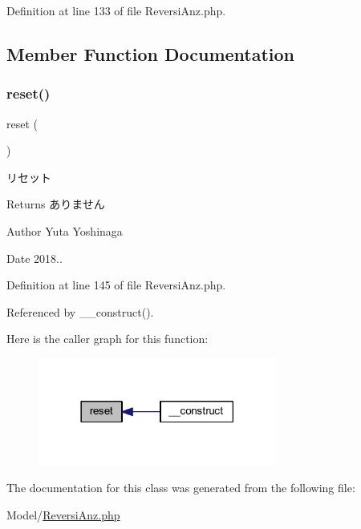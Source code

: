 Definition at line 133 of file Reversi\+Anz.\+php.



\subsection{Member Function Documentation}
\mbox{\label{class_reversi_anz_a4a20559544fdf4dcb457e258dc976cf8}} 
\subsubsection{\texorpdfstring{reset()}{reset()}}
{\footnotesize\ttfamily reset (\begin{DoxyParamCaption}{ }\end{DoxyParamCaption})}



リセット 

\begin{DoxyReturn}{Returns}
ありません 
\end{DoxyReturn}
\begin{DoxyAuthor}{Author}
Yuta Yoshinaga 
\end{DoxyAuthor}
\begin{DoxyDate}{Date}
2018.. 
\end{DoxyDate}


Definition at line 145 of file Reversi\+Anz.\+php.



Referenced by \+\_\+\+\_\+construct().

Here is the caller graph for this function\+:
\nopagebreak
\begin{figure}[H]
\begin{center}
\leavevmode
\includegraphics[width=222pt]{class_reversi_anz_a4a20559544fdf4dcb457e258dc976cf8_icgraph}
\end{center}
\end{figure}


The documentation for this class was generated from the following file\+:\begin{DoxyCompactItemize}
\item 
Model/\hyperlink{_reversi_anz_8php}{Reversi\+Anz.\+php}\end{DoxyCompactItemize}
